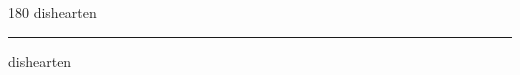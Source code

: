
\begin{frame}
\begin{center}
\begin{turn}{180}
{\fontsize{2.5cm}{1em}\selectfont dishearten}
\end{turn}
\vspace{1em}\par  
\hrule
\vspace{1em}\par  
{\fontsize{2.5cm}{1em}\selectfont dishearten}
\end{center}
\end{frame}
